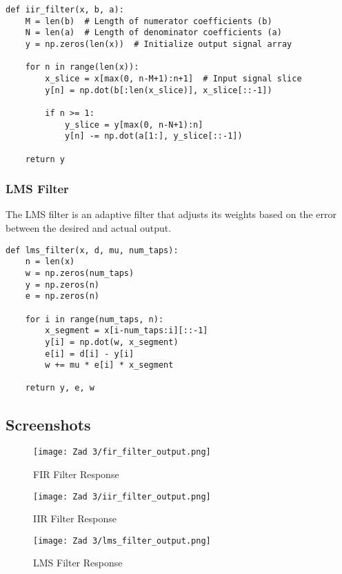\documentclass[a4paper,12pt]{article}
\begin{document}
\begin{verbatim}
def iir_filter(x, b, a):
    M = len(b)  # Length of numerator coefficients (b)
    N = len(a)  # Length of denominator coefficients (a)
    y = np.zeros(len(x))  # Initialize output signal array

    for n in range(len(x)):
        x_slice = x[max(0, n-M+1):n+1]  # Input signal slice
        y[n] = np.dot(b[:len(x_slice)], x_slice[::-1])

        if n >= 1:
            y_slice = y[max(0, n-N+1):n]
            y[n] -= np.dot(a[1:], y_slice[::-1])

    return y
\end{verbatim}

\subsubsection{LMS Filter}

The LMS filter is an adaptive filter that adjusts its weights based on the error between the desired and actual output.

\begin{verbatim}
def lms_filter(x, d, mu, num_taps):
    n = len(x)
    w = np.zeros(num_taps)
    y = np.zeros(n)
    e = np.zeros(n)

    for i in range(num_taps, n):
        x_segment = x[i-num_taps:i][::-1]
        y[i] = np.dot(w, x_segment)
        e[i] = d[i] - y[i]
        w += mu * e[i] * x_segment
    
    return y, e, w
\end{verbatim}

\subsection{Screenshots}

\vfill
\begin{figure}[htbp]
\centering
\texttt{[image: Zad 3/fir\_filter\_output.png]} 
\caption{FIR Filter Response}
\label{fig:window_spectra_comparison}
\end{figure}

\begin{figure}[htbp]
\centering
\texttt{[image: Zad 3/iir\_filter\_output.png]} 
\caption{IIR Filter Response}
\label{fig:window_spectra_comparison}
\end{figure}

\begin{figure}[htbp]
\centering
\texttt{[image: Zad 3/lms\_filter\_output.png]} 
\caption{LMS Filter Response}
\label{fig:window_spectra_comparison}
\end{figure}
\end{document}
